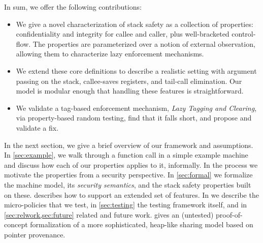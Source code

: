 \documentclass[10pt,conference]{ieeetran}%
\theoremstyle{definition}
\begin{document}



In sum, we offer the following contributions:

\begin{itemize}
\item We give a novel characterization of stack safety as a collection
  of properties: confidentiality and integrity for callee and caller,
  plus well-bracketed control-flow.
  The properties are parameterized over a notion of
  external observation, allowing them to characterize lazy enforcement
  mechanisms.
\item We extend these core definitions to
  describe a realistic setting with argument passing on the stack,
  callee-saves registers, and tail-call elimination. Our model is
  modular enough that handling these features is straightforward.
\item We validate a tag-based enforcement mechanism, \emph{Lazy
  Tagging and Clearing}, via property-based random testing, find that
it falls short, and propose and validate a fix.
\end{itemize}

In the next section, we give a brief overview of our framework and
assumptions. In \cref{sec:example}, we walk through a function call in
a simple example machine and discuss how each of our properties
applies to it, informally. In the process we motivate the properties
from a security perspective.
%
In \cref{sec:formal} we formalize the machine model,
its {\em security semantics}, and the stack safety properties built on these.
 describes how to support an extended set of features.
In  we describe the micro-policies that we test,
in \cref{sec:testing} the testing framework itself, and in
\cref{sec:relwork,sec:future} related and future work.
 gives an (untested) proof-of-concept formalization of a more sophisticated,
heap-like sharing model based on pointer provenance.
\end{document}
